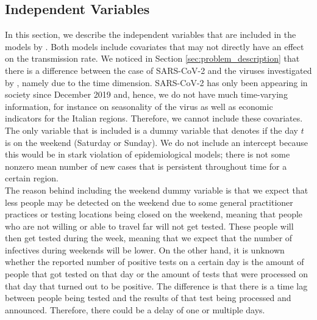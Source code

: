 \documentclass[12pt]{article}
\begin{document}
	\subsection{Independent Variables} \label{subsec:regressor_data}
	In this section, we describe the independent variables that are included in the models by \textcite{adda2016economic}. Both models include covariates that may not directly have an effect on the transmission rate. We noticed in Section \ref{sec:problem_description} that there is a difference between the case of SARS-CoV-2 and the viruses investigated by \textcite{adda2016economic}, namely due to the time dimension. SARS-CoV-2 has only been appearing in society since December 2019 and, hence, we do not have much time-varying information, for instance on seasonality of the virus as well as economic indicators for the Italian regions. Therefore, we cannot include these covariates. The only variable that is included is a dummy variable that denotes if the day $t$ is on the weekend (Saturday or Sunday). We do not include an intercept because this would be in stark violation of epidemiological models; there is not some nonzero mean number of new cases that is persistent throughout time for a certain region. \\
	
	The reason behind including the weekend dummy variable is that we expect that less people may be detected on the weekend due to some general practitioner practices or testing locations being closed on the weekend, meaning that people who are not willing or able to travel far will not get tested. These people will then get tested during the week, meaning that we expect that the number of infectives during weekends will be lower. On the other hand, it is unknown whether the reported number of positive tests on a certain day is the amount of people that got tested on that day or the amount of tests that were processed on that day that turned out to be positive. The difference is that there is a time lag between people being tested and the results of that test being processed and announced. Therefore, there could be a delay of one or multiple days.
	
	
\end{document}
